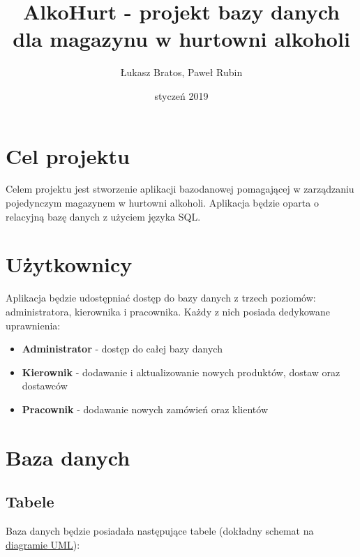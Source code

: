 \documentclass[12pt,a4paper]{article}
\author{Łukasz Bratos, Paweł Rubin}
\title{AlkoHurt - projekt bazy danych dla magazynu w hurtowni alkoholi}
\date{styczeń 2019}
\begin{document}
\maketitle

\section*{Cel projektu}

    Celem projektu jest stworzenie aplikacji bazodanowej pomagającej w zarządzaniu pojedynczym magazynem w hurtowni alkoholi. Aplikacja będzie oparta o relacyjną bazę danych z użyciem języka SQL.
    
\section*{Użytkownicy}
    
    Aplikacja będzie udostępniać dostęp do bazy danych z trzech poziomów: administratora, kierownika i pracownika. Każdy z nich posiada dedykowane uprawnienia:
    \begin{itemize}
        \item \textbf{Administrator} - dostęp do całej bazy danych
        \item \textbf{Kierownik} - dodawanie i aktualizowanie nowych produktów, dostaw oraz dostawców
        \item \textbf{Pracownik} - dodawanie nowych zamówień oraz klientów
    \end{itemize}
    
\section*{Baza danych}
\subsection*{Tabele}

    Baza danych będzie posiadała następujące tabele (dokładny schemat na  \hyperref[fig:diagram]{diagramie UML}):
    
\end{document}
